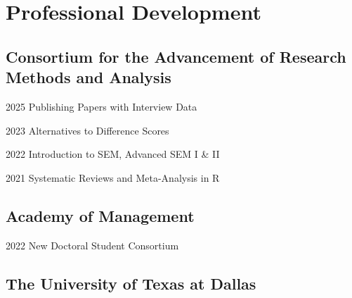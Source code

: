 \documentclass[12pt,letterpaper]{report} %
\begin{document}






    \section*{Professional Development}

    \subsection*{Consortium for the Advancement of Research Methods and Analysis}

    \begin{tablist}
    
        \item[2025]\tab{}Publishing Papers with Interview Data
        \item[2023]\tab{}Alternatives to Difference Scores
        \item[2022]\tab{}Introduction to SEM, Advanced SEM I \& II
        \item[2021]\tab{}Systematic Reviews and Meta-Analysis in R

    \end{tablist}

    \subsection*{Academy of Management}

    \begin{tablist}
        \item[2022]\tab{}New Doctoral Student Consortium
        
    \end{tablist}


    \subsection*{The University of Texas at Dallas}
\end{document}
